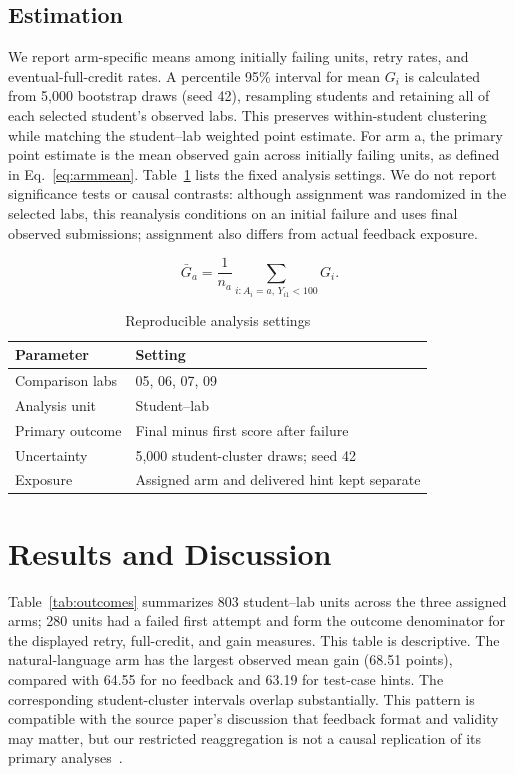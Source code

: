 \documentclass[conference]{IEEEtran}
\begin{document}
\subsection{Estimation}
We report arm-specific means among initially failing units, retry rates, and eventual-full-credit rates. A percentile 95\% interval for mean $G_i$ is calculated from 5,000 bootstrap draws (seed 42), resampling students and retaining all of each selected student's observed labs. This preserves within-student clustering while matching the student--lab weighted point estimate. For arm a, the primary point estimate is the mean observed gain across initially failing units, as defined in Eq.~\ref{eq:armmean}. Table~\ref{tab:parameters} lists the fixed analysis settings. We do not report significance tests or causal contrasts: although assignment was randomized in the selected labs, this reanalysis conditions on an initial failure and uses final observed submissions; assignment also differs from actual feedback exposure.

\begin{equation}
\bar{G}_a=\frac{1}{n_a}\sum_{i:A_i=a,\,Y_{i1}<100} G_i.
\label{eq:armmean}
\end{equation}
\begin{table}[t]
\centering
\caption{Reproducible analysis settings}
\label{tab:parameters}
\small
\begin{tabular}{ll}
\toprule
Parameter & Setting \\
\midrule
Comparison labs & 05, 06, 07, 09 \\
Analysis unit & Student--lab \\
Primary outcome & Final minus first score after failure \\
Uncertainty & 5,000 student-cluster draws; seed 42 \\
Exposure & Assigned arm and delivered hint kept separate \\
\bottomrule
\end{tabular}
\end{table}

\section{Results and Discussion}\label{sec:results}
Table~\ref{tab:outcomes} summarizes 803 student--lab units across the three assigned arms; 280 units had a failed first attempt and form the outcome denominator for the displayed retry, full-credit, and gain measures. This table is descriptive. The natural-language arm has the largest observed mean gain (68.51 points), compared with 64.55 for no feedback and 63.19 for test-case hints. The corresponding student-cluster intervals overlap substantially. This pattern is compatible with the source paper's discussion that feedback format and validity may matter, but our restricted reaggregation is not a causal replication of its primary analyses~\cite{heickal2026}.
\end{document}
